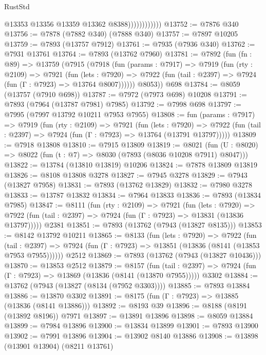 \begin{lexlean}{RustStd}
\begin{coremodule}
                            @13353
                            @13356
                            @13359
                            @13362
                            @8388))))))))))))
@13752 := @7876 @340
@13756 := @7878 (@7882 @340) (@7888 @340)
@13757 := @7897 @10205
@13759 := @7893 (@13757 @7912)
@13761 := @7935 (@7936 @340)
@13762 := @7931 @13761
@13764 := @7893 (@13762 @7960)
@13781 := @7892
    (fun (fn : @89) =>
    @13759
      (@7915
        (@7918
          (fun (params : @7917) =>
          @7919
            (fun (rty : @2109) =>
            @7921
              (fun (lets : @7920) =>
              @7922 (fun (tail : @2397) => @7924 (fun (Γ : @7923) => @13764 @8007))))))
        @8053))
    @698
@13784 := @8059 (@13757 (@7910 @698))
@13787 := @7972 (@7973 @698) @10208
@13791 := @7893 (@7964 (@13787 @7981) @7985)
@13792 := @7998 @698
@13797 := @7995 (@7997 @13792 @10211 @7953 @7955)
@13808 := fun (params : @7917) =>
  @7919
    (fun (rty : @2109) =>
    @7921
      (fun (lets : @7920) =>
      @7922 (fun (tail : @2397) => @7924 (fun (Γ : @7923) => @13764 (@13791 @13797)))))
@13809 := @7918 @13808
@13810 := @7915 @13809
@13819 := @8021
    (fun (U : @8020) => @8022 (fun (t : @7) => @8030 (@7893 (@8036 @10208 @7911) @8047)))
@13822 := @13784 (@13810 @13819) @10206
@13824 := @7878 @13809 @13819
@13826 := @8108 @13808 @3278
@13827 := @7945 @3278
@13829 := @7943 (@13827 @7958)
@13831 := @7893 (@13762 @13829)
@13832 := @7980 @3278
@13833 := @13787 @13832
@13834 := @7964 @13833
@13836 := @7893 (@13834 @7985)
@13847 := @8111
    (fun (rty : @2109) =>
    @7921
      (fun (lets : @7920) =>
      @7922 (fun (tail : @2397) => @7924 (fun (Γ : @7923) => @13831 (@13836 @13797)))))
    @2381
@13851 := @7893 (@13762 (@7943 (@13827 @8135)))
@13853 := @8142 @13792 @10211
@13865 := @8133
    (fun (lets : @7920) =>
    @7922
      (fun (tail : @2397) =>
      @7924 (fun (Γ : @7923) => @13851 (@13836 (@8141 (@13853 @7953 @7955))))))
    @2512
@13869 := @7893 (@13762 (@7943 (@13827 @10436)))
@13870 := @13853 @2512
@13879 := @8157
    (fun (tail : @2397) => @7924 (fun (Γ : @7923) => @13869 (@13836 (@8141 (@13870 @7955)))))
    @3302
@13884 := @13762 (@7943 (@13827 (@8134 (@7952 @3303))))
@13885 := @7893 @13884
@13886 := @13870 @3302
@13891 := @8175 (fun (Γ : @7923) => @13885 (@13836 (@8141 @13886)))
@13892 := @8193 @39
@13896 := @8188 (@8191 (@13892 @8196)) @7971
@13897 := @13891 @13896
@13898 := @8059 @13884
@13899 := @7984 @13896
@13900 := @13834 @13899
@13901 := @7893 @13900
@13902 := @7991 @13896
@13904 := @13902 @8140 @13886
@13908 := @13898 (@13901 @13904) (@8211 @13761)

\end{coremodule}
\end{lexlean}

